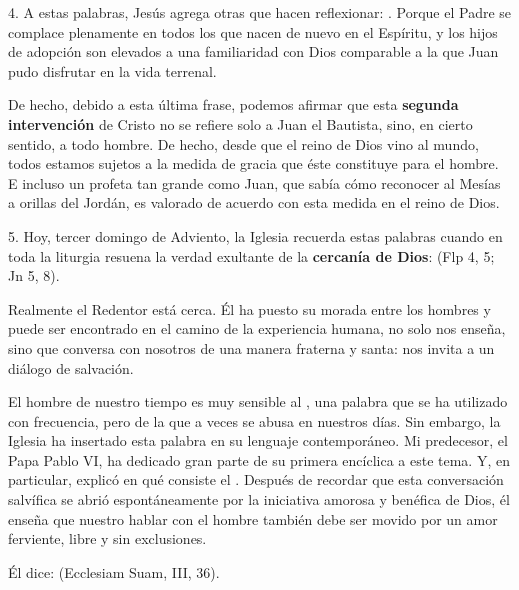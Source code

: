 \begin{body}
\begin{body}
4. A estas palabras, Jesús agrega otras que hacen reflexionar: . Porque el Padre se complace plenamente en todos los que nacen de nuevo en el Espíritu, y los hijos de adopción son elevados a una familiaridad con Dios comparable a la que Juan pudo disfrutar en la vida terrenal.

De hecho, debido a esta última frase, podemos afirmar que esta \textbf{segunda intervención} de Cristo no se refiere solo a Juan el Bautista, sino, en cierto sentido, a todo hombre. De hecho, desde que el reino de Dios vino al mundo, todos estamos sujetos a la medida de gracia que éste constituye para el hombre. E incluso un profeta tan grande como Juan, que sabía cómo reconocer al Mesías a orillas del Jordán, es valorado de acuerdo con esta medida en el reino de Dios.

5. Hoy, tercer domingo de Adviento, la Iglesia recuerda estas palabras cuando en toda la liturgia resuena la verdad exultante de la \textbf{cercanía de Dios}:  (Flp 4, 5; Jn 5, 8).

Realmente el Redentor está cerca. Él ha puesto su morada entre los hombres y puede ser encontrado en el camino de la experiencia humana, no solo nos enseña, sino que conversa con nosotros de una manera fraterna y santa: nos invita a un diálogo de salvación.

El hombre de nuestro tiempo es muy sensible al , una palabra que se ha utilizado con frecuencia, pero de la que a veces se abusa en nuestros días. Sin embargo, la Iglesia ha insertado esta palabra en su lenguaje contemporáneo. Mi predecesor, el Papa Pablo VI, ha dedicado gran parte de su primera encíclica a este tema. Y, en particular, explicó en qué consiste el . Después de recordar que esta conversación salvífica se abrió espontáneamente por la iniciativa amorosa y benéfica de Dios, él enseña que nuestro hablar con el hombre también debe ser movido por un amor ferviente, libre y sin exclusiones.

Él dice:  (Ecclesiam Suam, III, 36).


\end{body}
\end{body}
